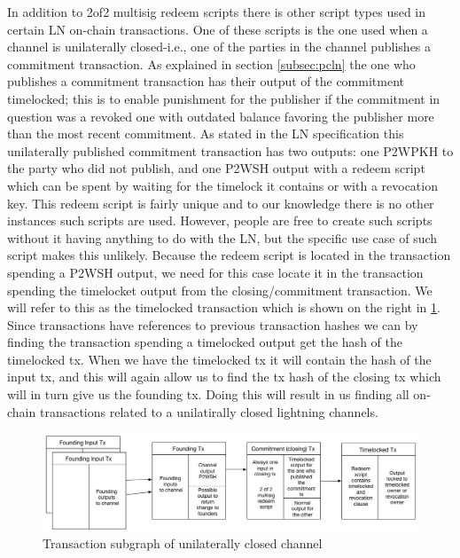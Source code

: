 In addition to 2of2 multisig redeem scripts there is other script types used in certain LN on-chain transactions. One of these scripts is the one used when a channel is unilaterally closed-i.e., one of the parties in the channel publishes a commitment transaction. As explained in section \cref{subsec:pcln} the one who publishes a commitment transaction has their output of the commitment timelocked; this is to enable punishment for the publisher if the commitment in question was a revoked one with outdated balance favoring the publisher more than the most recent commitment. As stated in the LN specification \cite{bolt3} this unilaterally published commitment transaction has two outputs: one P2WPKH to the party who did not publish, and one P2WSH output with a redeem script which can be spent by waiting for the timelock it contains or with a revocation key. 
This redeem script is fairly unique and to our knowledge there is no other instances such scripts are used. However, people are free to create such scripts without it having anything to do with the LN, but the specific use case of such script makes this unlikely. Because the redeem script is located in the transaction spending a P2WSH output, we need for this case locate it in the transaction spending the timelocket output from the closing/commitment transaction. We will refer to this as the timelocked transaction which is shown on the right in \cref{fig:ln_tx_graph}. Since transactions have references to previous transaction hashes  we can by finding the transaction spending a timelocked output get the hash of the timelocked tx. When we have the timelocked tx it will contain the hash of the input tx, and this will again allow us to find the tx hash of the closing tx which will in turn give us the founding tx. Doing this will result in us finding all on-chain transactions related to a unilatirally closed lightning channels.

\begin{figure}[h]
    \centering
    \includegraphics[width=14cm]{figures/ln_tx_graph.png}
    \caption{Transaction subgraph of unilaterally closed channel}
    \label{fig:ln_tx_graph}
\end{figure}


